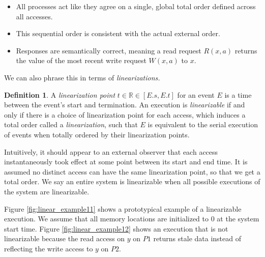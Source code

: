 \documentclass[]             %
{NASA}                       %
\theoremstyle{definition}
\newtheorem{definition}{Definition}[section]
\providecommand{\tightlist}{%
  \setlength{\itemsep}{0pt}\setlength{\parskip}{0pt}}
\begin{document}
\begin{itemize}
\tightlist
\item
  All processes act like they agree on a single, global total order
  defined across all accesses.
\item
  This sequential order is consistent with the actual external order.
\item
  Responses are semantically correct, meaning a read request \(R(x, a)\)
  returns the value of the most recent write request \(W(x, a)\) to
  \(x\).
\end{itemize}

We can also phrase this in terms of \emph{linearizations.}

\begin{definition}
A \emph{linearization point} $t \in \mathbb{R} \in [E.s, E.t]$ for an
event $E$ is a time between the event's start and termination. An
execution is \emph{linearizable} if and only if there is a choice of
linearization point for each access, which induces a total order called a \emph{linearization},
such that $E$ is equivalent to
the serial execution of events when totally ordered by their
linearization points.
\end{definition}

Intuitively, it should appear to an external observer that each access
instantaneously took effect at some point between its start and end
time. It is assumed no distinct access can have the same linearization
point, so that we get a total order. We say an entire system is
linearizable when all possible executions of the system are
linearizable.

Figure \ref{fig:linear_example11} shows a prototypical example of a
linearizable execution. We assume that all memory locations are
initialized to \(0\) at the system start time. Figure
\ref{fig:linear_example12} shows an execution that is not linearizable
because the read access on \(y\) on \(P1\) returns stale data instead of
reflecting the write access to \(y\) on \(P2\).
\end{document}
